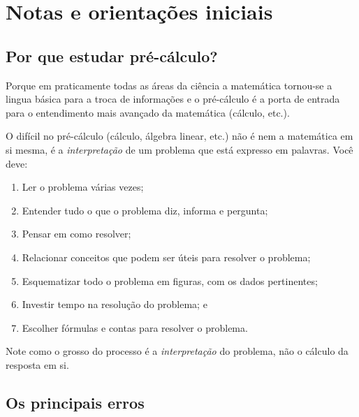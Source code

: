 \documentclass[pdftex, brazil, 12pt, twoside]{article}
\begin{document}
\section{Notas e orientações iniciais}
\label{notas}

\subsection{Por que estudar pré-cálculo?}
\label{notas-por-que}

Porque em praticamente todas as áreas da ciência a matemática
tornou-se a lingua básica para a troca de informações e o pré-cálculo é a porta de entrada
para o entendimento mais avançado da matemática (cálculo, etc.).

O difícil no pré-cálculo (cálculo, álgebra linear, etc.) não é nem a matemática em
si mesma, é a \emph{interpretação} de um problema que está expresso em palavras. Você
deve:

\begin{enumerate}[noitemsep]
\item Ler o problema várias vezes;
\item Entender tudo o que o problema diz, informa e pergunta;
\item Pensar em como resolver;
\item Relacionar conceitos que podem ser úteis para resolver o problema;
\item Esquematizar todo o problema em figuras, com os dados pertinentes;
\item Investir tempo na resolução do problema; e
\item Escolher fórmulas e contas para resolver o problema.
\end{enumerate}

Note como o grosso do processo é a \emph{interpretação} do problema, não o cálculo
da resposta em si.

\subsection{Os principais erros}
\label{notas-principais-erros}
\end{document}
